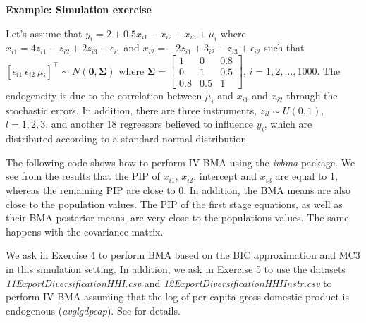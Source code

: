 \textbf{Example: Simulation exercise}

Let's assume that $y_i=2+0.5x_{i1}-x_{i2}+x_{i3}+\mu_i$ where $x_{i1}=4z_{i1}-z_{i2}+2z_{i3}+\epsilon_{i1}$ and $x_{i2}=-2z_{i1}+3_{i2}-z_{i3}+\epsilon_{i2}$ such that $[\epsilon_{i1} \ \epsilon_{i2} \ \mu_i]^{\top}\sim N(\bm{0}, \bm{\Sigma})$ where $\bm{\Sigma}=\begin{bmatrix} 1 & 0 & 0.8\\
0 & 1 & 0.5\\
0.8 & 0.5 & 1\end{bmatrix}$, $i=1,2,\dots,1000$. The endogeneity is due to the correlation between $\mu_i$ and $x_{i1}$ and $x_{i2}$ through the stochastic errors. In addition, there are three instruments, $z_{il}\sim U(0,1)$, $l=1,2,3$, and another 18 regressors believed to influence $y_i$, which are distributed according to a standard normal distribution.

The following code shows how to perform IV BMA using the \textit{ivbma} package. We see from the results that the PIP of $x_{i1}$, $x_{i2}$, intercept and $x_{i3}$ are equal to 1, whereas the remaining PIP are close to 0. In addition, the BMA means are also close to the population values. The PIP of the first stage equations, as well as their BMA posterior means, are very close to the populations values. The same happens with the covariance matrix. 

We ask in Exercise 4 to perform BMA based on the BIC approximation and MC3 in this simulation setting. In addition, we ask in Exercise 5 to use the datasets \textit{11ExportDiversificationHHI.csv} and \textit{12ExportDiversificationHHIInstr.csv} to perform IV BMA assuming that the log of per capita gross domestic product is endogenous (\textit{avglgdpcap}). See \cite{Jetter2015} for details.     

